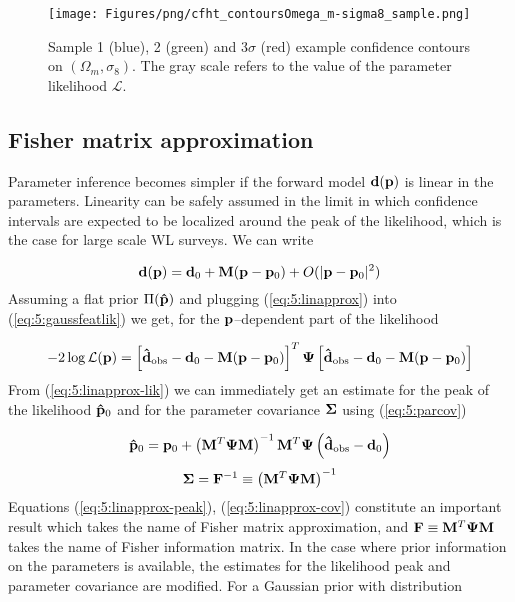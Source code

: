\begin{figure}
\begin{center}
\texttt{[image: Figures/png/cfht\_contoursOmega\_m-sigma8\_sample.png]}
\end{center}
\caption{Sample 1 (blue), 2 (green) and 3$\sigma$ (red) example confidence contours on $(\Omega_m,\sigma_8)$. The gray scale refers to the value of the parameter likelihood $\mathcal{L}$.}
\label{fig:5:contsample}
\end{figure}

\subsection{Fisher matrix approximation}
\label{sec:5:fisher}
Parameter inference becomes simpler if the forward model $\mathbf{d}(\mathbf{p})$ is linear in the parameters. Linearity can be safely assumed in the limit in which confidence intervals are expected to be localized around the peak of the likelihood, which is the case for large scale WL surveys. We can write 

\begin{equation}
\label{eq:5:linapprox}
\mathbf{d}(\mathbf{p}) = \mathbf{d}_0 + \mathbf{M}(\mathbf{p}-\mathbf{p}_0) + O(\vert\mathbf{p}-\mathbf{p}_0\vert^2)
\end{equation}          
%
Assuming a flat prior $\Pi(\mathbf{\hat{p}})$ and plugging (\ref{eq:5:linapprox}) into (\ref{eq:5:gaussfeatlik}) we get, for the $\mathbf{p}$--dependent part of the likelihood

\begin{equation}
\label{eq:5:linapprox-lik}
-2\log\mathcal{L}(\mathbf{p}) = \left[\mathbf{\hat{d}}_{\rm obs}-\mathbf{d}_0-\mathbf{M}(\mathbf{p}-\mathbf{p}_0)\right]^T\mathbf{\Psi}\left[\mathbf{\hat{d}}_{\rm obs}-\mathbf{d}_0-\mathbf{M}(\mathbf{p}-\mathbf{p}_0)\right]
\end{equation}
%
From (\ref{eq:5:linapprox-lik}) we can immediately get an estimate for the peak of the likelihood $\mathbf{\hat{p}}_0$ and for the parameter covariance $\mathbf{\Sigma}$ using (\ref{eq:5:parcov})

\begin{equation}
\label{eq:5:linapprox-peak}
\mathbf{\hat{p}}_0 = \mathbf{p}_0 + \left(\mathbf{M}^T\mathbf{\Psi}\mathbf{M}\right)^{-1}\mathbf{M}^T\mathbf{\Psi}\left(\mathbf{\hat{d}}_{\rm obs}-\mathbf{d}_0\right)
\end{equation}
%
\begin{equation}
\label{eq:5:linapprox-cov}
\mathbf{\Sigma} = \mathbf{F}^{-1} \equiv \left(\mathbf{M}^T\mathbf{\Psi}\mathbf{M}\right)^{-1} 
\end{equation}
%
Equations (\ref{eq:5:linapprox-peak}), (\ref{eq:5:linapprox-cov}) constitute an important result which takes the name of Fisher matrix approximation, and $\mathbf{F}\equiv\mathbf{M}^T\mathbf{\Psi}\mathbf{M}$ takes the name of Fisher information matrix. In the case where prior information on the parameters is available, the estimates for the likelihood peak and parameter covariance are modified. For a Gaussian prior with distribution

